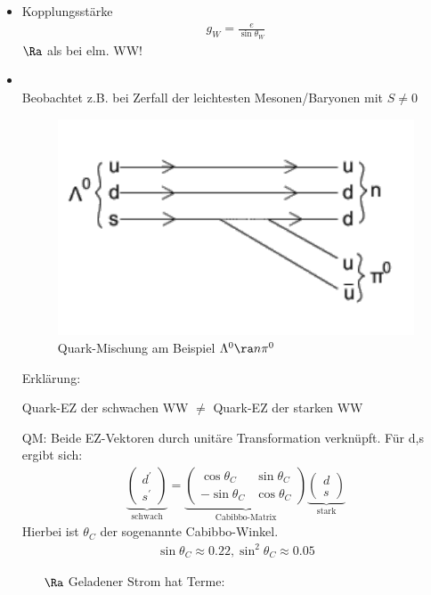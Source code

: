 \begin{itemize}
\item Kopplungsstärke
\begin{align}
g_W = \frac{e}{\sin \theta_W}
\end{align}
$\Ra$  als bei elm. WW!
\item {}\\
Beobachtet z.B. bei Zerfall der leichtesten Mesonen/Baryonen mit $S\neq 0$

\begin{figure}[!ht]
\centering
\includegraphics[width=.5\textwidth]{imgs/ep5-fig-8-2.pdf}
\caption{Quark-Mischung am Beispiel $\Lambda^0 \ra n \pi^0$\label{fig:8.2}}
\end{figure}
\newpage
Erklärung:
\begin{framed}
\begin{center}
Quark-EZ der schwachen WW $\neq$ Quark-EZ der starken WW
\end{center}
\end{framed}
QM: Beide EZ-Vektoren durch unitäre Transformation verknüpft. Für d,s ergibt sich:
\begin{align}
\boxed{ \underbrace{\begin{pmatrix}
d^\prime \\ s^\prime 
\end{pmatrix}}_\text{schwach} = \underbrace{\begin{pmatrix}
\cos \theta_C & \sin \theta_C\\ -\sin\theta_C & \cos \theta_C \end{pmatrix}}_\text{Cabibbo-Matrix} \underbrace{\begin{pmatrix}
d \\ s
\end{pmatrix}}_\text{stark}
 }
\end{align}
Hierbei ist $\theta_C$ der sogenannte Cabibbo-Winkel.
\begin{align*}
\sin \theta_C \approx 0.22, \sin^2 \theta_C \approx 0.05
\end{align*}
\begin{itemize}
\item[$\Ra$] Geladener Strom hat Terme:

\end{itemize}
\end{itemize}
